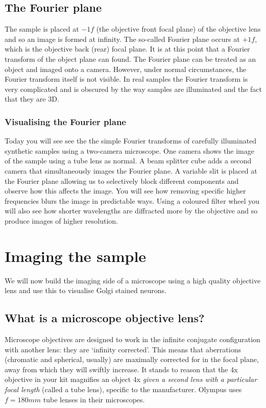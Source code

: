 \documentclass[a4paper]{report}
\begin{document}
\subsection{The Fourier plane}
The sample is placed at $-1f$ (the objective front focal plane) of the objective lens and so an image is formed at infinity.
The so-called Fourier plane occurs at $+1f$, which is the objective back (rear) focal plane. 
It is at this point that a Fourier transform of the object plane can found.
The Fourier plane can be treated as an object and imaged onto a camera. 
However, under normal circumstances, the Fourier transform itself is not visible. 
In real samples the Fourier transform is very complicated and is obscured by the way samples are illuminated and the fact that they are 3D.

\subsubsection{Visualising the Fourier plane}
Today you will see see the the simple Fourier transforms of carefully illuminated synthetic samples using a two-camera microscope. One camera shows the image of the sample using a tube lens as normal.
A beam splitter cube adds a second camera that simultaneously images the Fourier plane.
A variable slit is placed at the Fourier plane allowing us to selectively block different components and observe how this affects the image. 
You will see how removing specific higher frequencies blurs the image in predictable ways. 
Using a coloured filter wheel you will also see how shorter wavelengths are diffracted more by the objective and so produce images of higher resolution.   

\pagebreak


\section{Imaging the sample}


We will now build the imaging side of a microscope using a high quality objective lens and use this to visualise Golgi stained neurons.

\subsection{What is a microscope objective lens?}
Microscope objectives are designed to work in the infinite conjugate configuration with another lens: they are `infinity corrected'.
This means that aberrations (chromatic and spherical, usually) are maximally corrected for in the focal plane, away from which they will swiftly increase.
It stands to reason that the 4x objective in your kit magnifies an object 4x \emph{given a second lens with a particular focal length} (called a tube lens), specific to the manufacturer. Olympus uses $f=180mm$ tube lenses in their microscopes.
\end{document}
